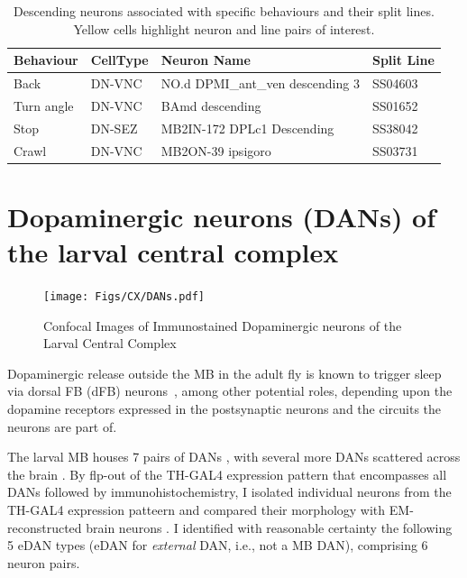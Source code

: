     \begin{table}[ht]
        \centering
        \begin{tabular}{l l p{} l}
            \toprule
            \textbf{Behaviour} & \textbf{CellType} & \textbf{Neuron Name} & \textbf{Split Line} \\
            \midrule
            Back & DN-VNC & \cellcolor{cxhl} NO.d DPMI\_ant\_ven descending 3 & \cellcolor{cxhl} SS04603 \\
            Turn angle & DN-VNC & \cellcolor{cxhl} BAmd descending & \cellcolor{cxhl} SS01652 \\
            Stop & DN-SEZ & \cellcolor{cxhl} MB2IN-172 DPLc1 Descending & \cellcolor{cxhl} SS38042 \\
            Crawl & DN-VNC & \cellcolor{cxhl} MB2ON-39 ipsigoro & \cellcolor{cxhl} SS03731 \\
            \bottomrule
        \end{tabular}
        \caption[Behaviour of CX Descending Neurons]{Descending neurons associated with specific behaviours and their split lines. Yellow cells highlight neuron and line pairs of interest.}
        \label{behaviourCXdescending}
    \end{table}

\section{Dopaminergic neurons (DANs) of the larval central complex}
\label{CXDANs}
    
    \begin{figure}
        \centering
        \texttt{[image: Figs/CX/DANs.pdf]}
        \caption{Confocal Images of Immunostained Dopaminergic neurons of the Larval Central Complex}
        \label{DANs}
    \end{figure}

Dopaminergic release outside the MB in the adult fly is known to trigger sleep via dorsal FB (dFB) neurons~\citep{pimentel2016sleep}, among other potential roles, depending upon the dopamine receptors expressed in the postsynaptic neurons and the circuits the neurons are part of.

The larval MB houses 7 pairs of DANs \citep{eichler2017complete}, with several more DANs scattered across the brain \citep{selcho2009thgal4}. By flp-out of the TH-GAL4 expression pattern that encompasses all DANs \citep{selcho2009thgal4} followed by immunohistochemistry, I isolated individual neurons from the TH-GAL4 expression patteern and compared their morphology with EM-reconstructed brain neurons \citep{winding2023connectome}. I identified with reasonable certainty the following 5 eDAN types (eDAN for \textit{external} DAN, i.e., not a MB DAN), comprising 6 neuron pairs.

